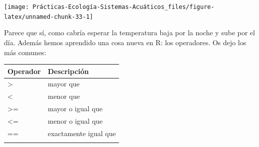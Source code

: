 \documentclass[
]{book}
\begin{document}
\texttt{[image: Prácticas-Ecología-Sistemas-Acuáticos\_files/figure-latex/unnamed-chunk-33-1]}

Parece que sí, como cabría esperar la temperatura baja por la noche y sube por el día. Además hemos aprendido una cosa nueva en R: los operadores. Os dejo los más comunes:

\begin{longtable}[]{@{}ll@{}}
\toprule
\begin{minipage}[b]{0.14\columnwidth}\raggedright
Operador\strut
\end{minipage} & \begin{minipage}[b]{0.31\columnwidth}\raggedright
Descripción\strut
\end{minipage}\tabularnewline
\midrule
\endhead
\begin{minipage}[t]{0.14\columnwidth}\raggedright
\textgreater{}\strut
\end{minipage} & \begin{minipage}[t]{0.31\columnwidth}\raggedright
mayor que\strut
\end{minipage}\tabularnewline
\begin{minipage}[t]{0.14\columnwidth}\raggedright
\textless{}\strut
\end{minipage} & \begin{minipage}[t]{0.31\columnwidth}\raggedright
menor que\strut
\end{minipage}\tabularnewline
\begin{minipage}[t]{0.14\columnwidth}\raggedright
\textgreater=\strut
\end{minipage} & \begin{minipage}[t]{0.31\columnwidth}\raggedright
mayor o igual que\strut
\end{minipage}\tabularnewline
\begin{minipage}[t]{0.14\columnwidth}\raggedright
\textless=\strut
\end{minipage} & \begin{minipage}[t]{0.31\columnwidth}\raggedright
menor o igual que\strut
\end{minipage}\tabularnewline
\begin{minipage}[t]{0.14\columnwidth}\raggedright
==\strut
\end{minipage} & \begin{minipage}[t]{0.31\columnwidth}\raggedright
exactamente igual que\strut
\end{minipage}\tabularnewline
\begin{minipage}[t]{0.14\columnwidth}\raggedright

\end{minipage}
\end{longtable}
\end{document}
